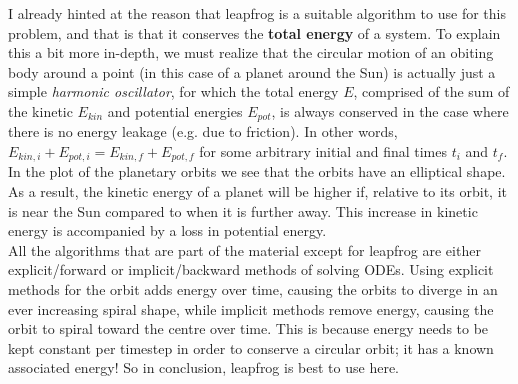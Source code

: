I already hinted at the reason that leapfrog is a suitable algorithm to use for this problem, and that is that it conserves the \textbf{total energy} of a system. To explain this a bit more in-depth, we must realize that the circular motion of an obiting body around a point (in this case of a planet around the Sun) is actually just a simple \textit{harmonic oscillator}, for which the total energy $E$, comprised of the sum of the kinetic $E_{kin}$ and potential energies $E_{pot}$, is always conserved in the case where there is no energy leakage (e.g. due to friction). In other words, $E_{kin,i} + E_{pot,i} = E_{kin,f} + E_{pot,f}$ for some arbitrary initial and final times $t_i$ and $t_f$. In the plot of the planetary orbits we see that the orbits have an elliptical shape. As a result, the kinetic energy of a planet will be higher if, relative to its orbit, it is near the Sun compared to when it is further away. This increase in kinetic energy is accompanied by a loss in potential energy.\\

All the algorithms that are part of the material except for leapfrog are either explicit/forward or implicit/backward methods of solving ODEs. Using explicit methods for the orbit adds energy over time, causing the orbits to diverge in an ever increasing spiral shape, while implicit methods remove energy, causing the orbit to spiral toward the centre over time. This is because energy needs to be kept constant per timestep in order to conserve a circular orbit; it has a known associated energy! So in conclusion, leapfrog is best to use here. 


